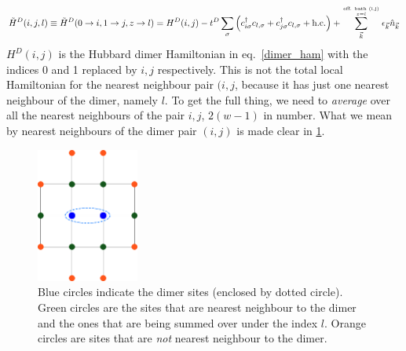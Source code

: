 \documentclass{article}
\numberwithin{equation}{section}
\begin{document}
\begin{equation}\begin{aligned}
	\label{Hdjl}
	\tilde H^D(i, j, l) \equiv \tilde H^D(0\to i, 1\to j, z \to l) = H^D(i, j) - t^D \sum_{\sigma}\left(c^\dagger_{i\sigma}c_{l,\sigma} + c^\dagger_{j\sigma}c_{l,\sigma} + \text{h.c.}\right) + \sum_{\vec k}^{\text{eff. bath (i,j)}\atop{z = l}}\epsilon_{\vec k}\hat n_{\vec k}\\
\end{aligned}\end{equation}
\(H^D(i, j)\) is the Hubbard dimer Hamiltonian in eq.~\ref{dimer_ham} with the indices 0 and 1 replaced by \(i, j\) respectively. This is not the total local Hamiltonian for the nearest neighbour pair \((i,j\), because it has just one nearest neighbour of the dimer, namely \(l\). To get the full thing, we need to \textit{average} over all the nearest neighbours of the pair \(i,j\), \(2(w-1)\) in number. What we mean by nearest neighbours of the dimer pair \((i,j)\) is made clear in \ref{dimer-nn}.
\begin{figure}[htpb]
	\centering
	\includegraphics[width=0.3\textwidth]{dimer-nn.png}
	\caption{Blue circles indicate the dimer sites (enclosed by dotted circle). Green circles are the sites that are nearest neighbour to the dimer and the ones that are being summed over under the index \(l\). Orange circles are sites that are \textit{not} nearest neighbour to the dimer.}
	\label{dimer-nn}
\end{figure}
\end{document}
